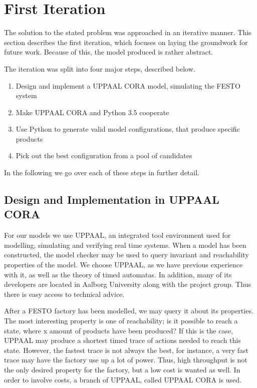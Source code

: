 \chapter{First Iteration}
\label{ch:firstiteration}
The solution to the stated problem was approached in an iterative manner. This section describes the first iteration, which focuses on laying the groundwork for future work. Because of this, the model produced is rather abstract.

The iteration was split into four major steps, described below.

\begin{enumerate}
\item Design and implement a UPPAAL CORA model, simulating the FESTO system
\item Make UPPAAL CORA and Python 3.5 cooperate 
\item Use Python to generate valid model configurations, that produce specific products
\item Pick out the best configuration from a pool of candidates
\end{enumerate}

In the following we go over each of these steps in further detail.

\section{Design and Implementation in UPPAAL CORA}
For our models we use UPPAAL, an integrated tool environment used for modelling, simulating and verifying real time systems. When a model has been constructed, the model checker may be used to query invariant and reachability properties of the model. We choose UPPAAL, as we have previous experience with it, as well as the theory of timed automatas. In addition, many of its developers are located in Aalborg University along with the project group. Thus there is easy access to technical advice.

After a FESTO factory has been modelled, we may query it about its properties. The most interesting property is one of reachability; is it possible to reach a state, where x amount of products have been produced? If this is the case, UPPAAL may produce a shortest timed trace of actions needed to reach this state. However, the fastest trace is not always the best, for instance, a very fast trace may have the factory use up a lot of power. Thus, high throughput is not the only desired property for the factory, but a low cost is wanted as well. In order to involve costs, a branch of UPPAAL, called UPPAAL CORA is used.

